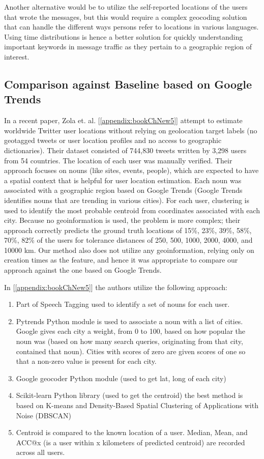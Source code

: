 Another alternative would be to utilize the self-reported locations of the users that wrote the messages, but %
this would require a complex geocoding solution that can handle the different ways persons refer to locations in various %
languages. Using time distributions  is hence %
 a better solution for quickly understanding important keywords in message traffic as they pertain to a geographic region of interest.

\subsection{Comparison against Baseline based on Google Trends}

In a recent paper, Zola et. al. [\ref{appendix:bookChNew5}] attempt to estimate worldwide Twitter user locations without relying on geolocation target labels (no geotagged tweets or user location profiles and no access to geographic dictionaries). Their dataset consisted of 744,830 tweets written by 3,298 users from 54 countries. The location of each user was manually verified. Their approach focuses on nouns (like sites, events, people), which are expected to have a spatial context that is helpful for user location estimation. Each noun was associated with a geographic region based on Google Trends (Google Trends identifies nouns that are trending in various cities). For each user, clustering is used to identify the most probable centroid from coordinates associated with each city. Because no geoinformation is used, the problem is more complex; their approach correctly predicts the ground truth locations of 15\%, 23\%, 39\%, 58\%, 70\%, 82\% of the users for tolerance distances of 250, 500, 1000, 2000, 4000, and 10000 km. Our method also does not utilize any geoinformation, relying only on creation times as the feature, and hence it was appropriate to compare our approach against the one based on Google Trends.

In [\ref{appendix:bookChNew5}] the authors utilize the following approach:
\begin{enumerate}
\item Part of Speech Tagging used to identify a set of nouns for each user.
\item Pytrends Python module is used to associate a noun with a list of cities. Google gives each city a weight, from 0 to 100, based on how popular the noun was (based on how many search queries, originating from that city, contained that noun). Cities with scores of zero are given scores of one so that a non-zero value is present for each city. 
\item Google geocoder Python module (used to get lat, long of each city)
\item Scikit-learn Python library (used to get the centroid) the best method is based on K-means and Density-Based Spatial Clustering of Applications with Noise (DBSCAN) 
\item Centroid is compared to the known location of a user. Median, Mean, and ACC@x (is a user within x kilometers of predicted centroid) are recorded across all users.
\end{enumerate}

